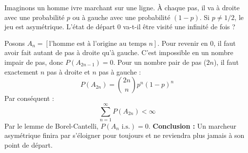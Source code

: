 \begin{exemple}
    Imaginons un homme ivre marchant sur une ligne. À chaque pas, il va à droite avec une probabilité $p$ ou à gauche avec une probabilité $(1-p)$. Si $p \neq 1/2$, le jeu est asymétrique. L'état de départ $0$ va-t-il être visité une infinité de fois ?
    
    Posons $A_n = [\text{l'homme est à l'origine au temps } n]$.
    Pour revenir en $0$, il faut avoir fait autant de pas à droite qu'à gauche. C'est impossible en un nombre impair de pas, donc $P(A_{2n-1}) = 0$.
    Pour un nombre pair de pas ($2n$), il faut exactement $n$ pas à droite et $n$ pas à gauche :
    \[
    P(A_{2n}) = \binom{2n}{n} p^n (1-p)^n
    \]
   Par conséquent :
    \[
    \sum_{n=1}^{\infty} P(A_{2n}) < \infty
    \]
    Par le lemme de Borel-Cantelli, $P(A_n \text{ i.s.}) = 0$. \textbf{Conclusion :} Un marcheur asymétrique finira par s'éloigner pour toujours et ne reviendra plus jamais à son point de départ.
\end{exemple}
